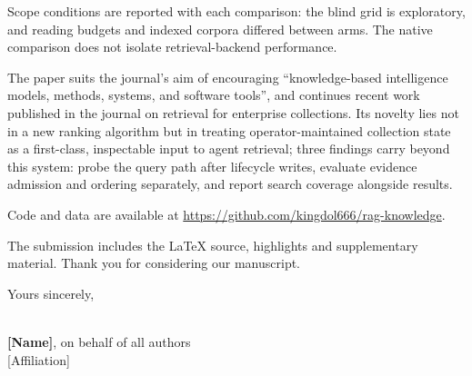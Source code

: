 \documentclass[11pt,a4paper]{article}
\begin{document}
Scope conditions are reported with each comparison: the blind grid is
exploratory, and reading budgets and indexed corpora differed between arms.
The native comparison does not isolate retrieval-backend performance.

The paper suits the journal's aim of encouraging
``knowledge-based intelligence models, methods, systems, and software
tools'', and continues recent work published in the journal on retrieval
for enterprise collections. Its novelty lies not in a new ranking
algorithm but in treating operator-maintained collection state as a
first-class, inspectable input to agent retrieval; three findings carry
beyond this system: probe the query path after lifecycle writes, evaluate
evidence admission and ordering separately, and report search coverage
alongside results.

Code and data are available at \url{https://github.com/kingdol666/rag-knowledge}.

The submission includes the \LaTeX{} source, highlights and supplementary
material. Thank you for considering our manuscript.

Yours sincerely,

\medskip
[Signature]\\
\textbf{[Name]}, on behalf of all authors\\
{}[Affiliation]\quad [Email]
\end{document}
